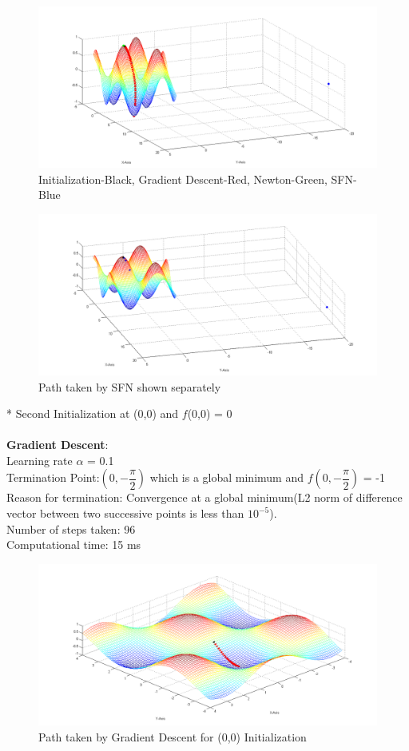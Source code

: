 \begin{figure}[H]
\includegraphics[scale = 0.51]{51.png}
\caption{Initialization-Black, Gradient Descent-Red, Newton-Green, SFN-Blue}
\end{figure}

\begin{figure}[H]
\includegraphics[scale = 0.51]{52.png}
\caption{Path taken by SFN shown separately}
\end{figure}

* Second Initialization at (0,0) and $f$(0,0) = 0
\\\\
\textbf{Gradient Descent}: 
\\Learning rate $\alpha$ = 0.1
\\Termination Point:$(0, -\dfrac{\pi}{2})$ which is a global minimum and $f(0,-\dfrac{\pi}{2})$ = -1
\\Reason for termination: Convergence at a global minimum(L2 norm of difference vector between two successive points is less than $10^{-5}$).
\\Number of steps taken: 96
\\Computational time: 15 ms

\begin{figure}[H]
\includegraphics[scale = 0.45]{53.png}
\caption{Path taken by Gradient Descent for (0,0) Initialization}
\end{figure}

